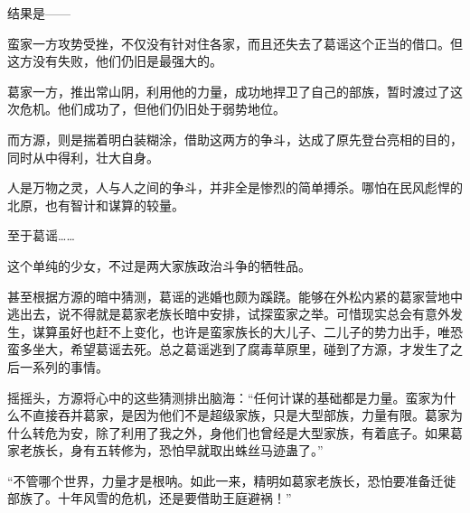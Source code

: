\begin{this_body}
结果是——

蛮家一方攻势受挫，不仅没有针对住各家，而且还失去了葛谣这个正当的借口。但这方没有失败，他们仍旧是最强大的。

葛家一方，推出常山阴，利用他的力量，成功地捍卫了自己的部族，暂时渡过了这次危机。他们成功了，但他们仍旧处于弱势地位。

而方源，则是揣着明白装糊涂，借助这两方的争斗，达成了原先登台亮相的目的，同时从中得利，壮大自身。

人是万物之灵，人与人之间的争斗，并非全是惨烈的简单搏杀。哪怕在民风彪悍的北原，也有智计和谋算的较量。

至于葛谣……

这个单纯的少女，不过是两大家族政治斗争的牺牲品。

甚至根据方源的暗中猜测，葛谣的逃婚也颇为蹊跷。能够在外松内紧的葛家营地中逃出去，说不得就是葛家老族长暗中安排，试探蛮家之举。可惜现实总会有意外发生，谋算虽好也赶不上变化，也许是蛮家族长的大儿子、二儿子的势力出手，唯恐蛮多坐大，希望葛谣去死。总之葛谣逃到了腐毒草原里，碰到了方源，才发生了之后一系列的事情。

摇摇头，方源将心中的这些猜测排出脑海：“任何计谋的基础都是力量。蛮家为什么不直接吞并葛家，是因为他们不是超级家族，只是大型部族，力量有限。葛家为什么转危为安，除了利用了我之外，身他们也曾经是大型家族，有着底子。如果葛家老族长，身有五转修为，恐怕早就取出蛛丝马迹蛊了。”

“不管哪个世界，力量才是根呐。如此一来，精明如葛家老族长，恐怕要准备迁徙部族了。十年风雪的危机，还是要借助王庭避祸！”

\end{this_body}

